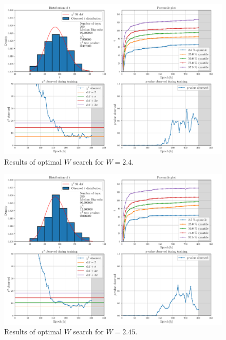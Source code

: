 \begin{figure}[H]
	\centering
	\includegraphics[width=1.0\textwidth]{Python/W_CLIP/ref200000_bkg20000_sig0/data_ref200000_bkg20000_sig0_wclip2-4.pdf}
	\caption{Results of optimal $W$ search for $W=2.4$.}
	\label{fig:REF200000_BKG20000_SIG0_WCLIP2.4}
\end{figure}
\vspace{-5mm}
\begin{figure}[H]
	\centering
	\includegraphics[width=1.0\textwidth]{Python/W_CLIP/ref300000_bkg20000_sig0/data_ref300000_bkg20000_sig0_wclip2-45.pdf}
	\caption{Results of optimal $W$ search for $W=2.45$.}
	\label{fig:REF300000_BKG20000_SIG0_WCLIP2.45}
\end{figure}

